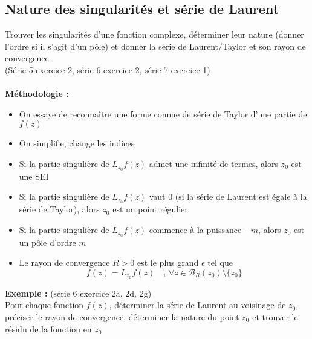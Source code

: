 \subsection{Nature des singularités et série de Laurent}
Trouver les singularités d’une fonction complexe, déterminer leur nature (donner l’ordre si il s’agit d’un pôle) et donner la série de Laurent/Taylor et son rayon de convergence. \\
(Série 5 exercice 2, série 6 exercice 2, série 7 exercice 1) \\
\\
\textbf{Méthodologie :}
\begin{itemize}
    \item On essaye de reconnaître une forme connue de série de Taylor d'une partie de $f(z)$
    \item On simplifie, change les indices
    \item Si la partie singulière de $L_{z_0}f(z)$ admet une infinité de termes, alors $z_0$ est une SEI
    \item Si la partie singulière de $L_{z_0}f(z)$ vaut $0$ (si la série de Laurent est égale à la série de Taylor), alors $z_0$ est un point régulier
    \item Si la partie singulière de $L_{z_0}f(z)$ commence à la puissance $-m$, alors $z_0$ est un pôle d'ordre $m$
    \item Le rayon de convergence $R > 0$ est le plus grand $\epsilon$ tel que
    $$f(z) = L_{z_0}f(z) \quad \text{, } \forall z \in \mathcal{B}_R(z_0) \setminus \{z_0\}$$
\end{itemize}
\textbf{Exemple :} (série 6 exercice 2a, 2d, 2g) \\
Pour chaque fonction $f(z)$, déterminer la série de Laurent au voisinage de $z_0$, préciser le rayon de convergence, déterminer la nature du point $z_0$ et trouver le résidu de la fonction en $z_0$
